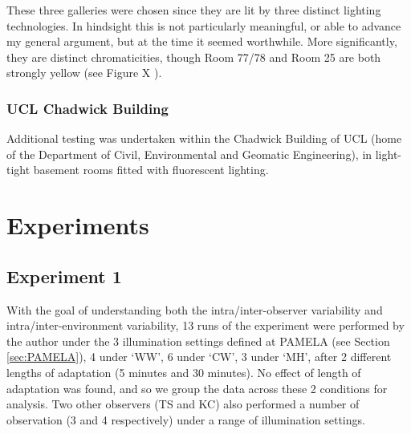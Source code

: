 

These three galleries were chosen since they are lit by three distinct lighting technologies. In hindsight this is not particularly meaningful, or able to advance my general argument, but at the time it seemed worthwhile. More significantly, they are distinct chromaticities, though Room 77/78 and Room 25 are both strongly yellow (see Figure X%
).

\subsubsection{\gls{UCL} Chadwick Building}

Additional testing was undertaken within the Chadwick Building of \gls{UCL} (home of the Department of Civil, Environmental and Geomatic Engineering), in light-tight basement rooms fitted with fluorescent lighting.




\newpage

\section{Experiments}

\subsection{Experiment 1}
With the goal of understanding both the intra/inter-observer variability and intra/inter-environment variability, 13 runs of the experiment were performed by the author under the 3 illumination settings defined at \gls{PAMELA} (see Section \ref{sec:PAMELA}), 4 under `WW', 6 under `CW', 3 under `MH', after 2 different lengths of adaptation (5 minutes and 30 minutes). No effect of length of adaptation was found, and so we group the data across these 2 conditions for analysis. Two other observers (TS and KC) also performed a number of observation (3 and 4 respectively) under a range of illumination settings.

